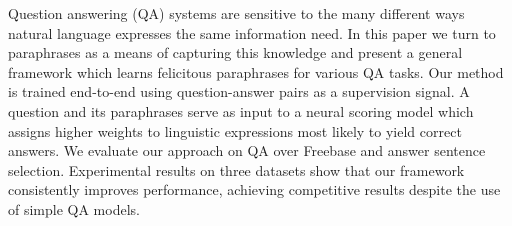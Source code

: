 Question answering (QA) systems are sensitive to the many different ways natural language expresses the same information need. In this paper we turn to paraphrases as a means of capturing this knowledge and present a general framework which learns felicitous paraphrases for various QA tasks. Our method is trained end-to-end using question-answer pairs as a supervision signal. A question and its paraphrases serve as input to a neural scoring model which assigns higher weights to linguistic expressions most likely to yield correct answers. We evaluate our approach on QA over Freebase and answer sentence selection. Experimental results on three datasets show that our framework consistently improves performance, achieving competitive results despite the use of simple QA models.
